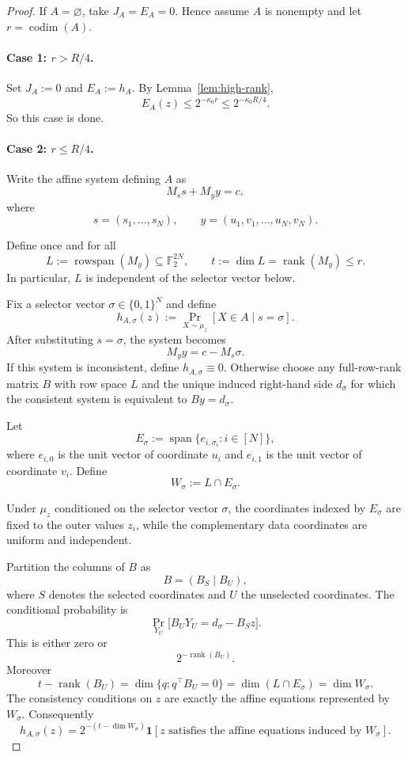 \documentclass[11pt]{article}
\theoremstyle{definition}
\newcommand{\F}{\mathbb F}
\newcommand{\bits}{\{0,1\}}
\newcommand{\codim}{\operatorname{codim}}
\newcommand{\Span}{\operatorname{span}}
\newcommand{\rowspan}{\operatorname{rowspan}}
\newcommand{\rank}{\operatorname{rank}}
\newcommand{\Prb}{\mathop{\Pr}}
\begin{document}
\begin{proof}
If $A=\varnothing$, take $J_A=E_A=0$.  Hence assume $A$ is nonempty and let
$r=\codim(A)$.

\paragraph{Case 1: $r>R/4$.}
Set $J_A:=0$ and $E_A:=h_A$.
By Lemma~\ref{lem:high-rank},
\[
  E_A(z)
  \le
  2^{-\kappa_0r}
  \le
  2^{-\kappa_0R/4}.
\]
So this case is done.

\paragraph{Case 2: $r\le R/4$.}
Write the affine system defining $A$ as
\[
  M_s s+M_y y=c,
  \tag{4.4}\label{eq:split-matrix}
\]
where
\[
  s=(s_1,\dots,s_N),\qquad
  y=(u_1,v_1,\dots,u_N,v_N).
\]

Define once and for all
\[
  L:=\rowspan(M_y)\subseteq\F_2^{2N},
  \qquad t:=\dim L=\rank(M_y)\le r.
\]
In particular, $L$ is independent of the selector vector below.

Fix a selector vector $\sigma\in\bits^N$ and define
\[
  h_{A,\sigma}(z)
  :=
  \Prb_{X\sim\mu_z}[X\in A\mid s=\sigma].
\]
After substituting $s=\sigma$, the system becomes
\[
  M_y y=c-M_s\sigma.
\]
If this system is inconsistent, define $h_{A,\sigma}\equiv0$.  Otherwise choose any
full-row-rank matrix $B$ with row space $L$ and the unique induced right-hand side
$d_\sigma$ for which the consistent system is equivalent to $By=d_\sigma$.

Let
\[
  E_\sigma
  :=
  \Span\{e_{i,\sigma_i}:i\in[N]\},
  \tag{4.5}\label{eq:Esigma}
\]
where $e_{i,0}$ is the unit vector of coordinate $u_i$ and $e_{i,1}$ is the unit
vector of coordinate $v_i$.
Define
\[
  W_\sigma:=L\cap E_\sigma.
  \tag{4.6}\label{eq:Wsigma}
\]

Under $\mu_z$ conditioned on the selector vector $\sigma$, the coordinates indexed
by $E_\sigma$ are fixed to the outer values $z_i$, while the complementary data
coordinates are uniform and independent.

Partition the columns of $B$ as
\[
  B=(B_S\mid B_U),
\]
where $S$ denotes the selected coordinates and $U$ the unselected coordinates.
The conditional probability is
\[
  \Prb_{Y_U}\bigl[B_UY_U=d_\sigma-B_Sz\bigr].
\]
This is either zero or
\[
  2^{-\rank(B_U)}.
\]
Moreover
\[
  t-\rank(B_U)
  =
  \dim\{q:q^\top B_U=0\}
  =
  \dim(L\cap E_\sigma)
  =
  \dim W_\sigma.
\]
The consistency conditions on $z$ are exactly the affine equations represented by
$W_\sigma$.  Consequently
\[
  h_{A,\sigma}(z)
  =
  2^{-(t-\dim W_\sigma)}
  \mathbf1[z\text{ satisfies the affine equations induced by }W_\sigma].
  \tag{4.7}\label{eq:conditional}
\]


\end{proof}
\end{document}
